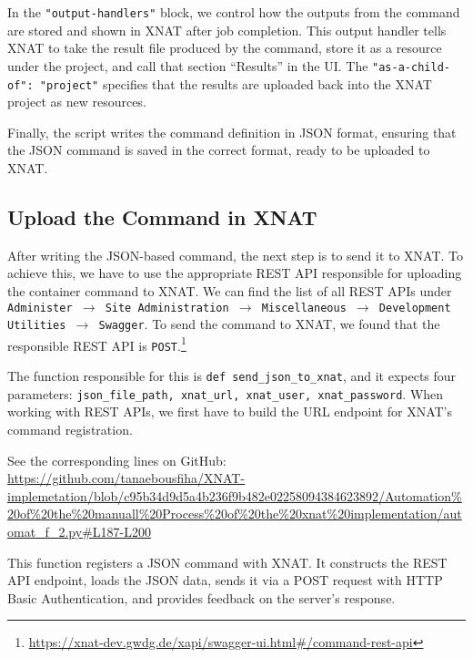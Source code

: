 In the \texttt{"output-handlers"} block, we control how the outputs from the command are stored and shown in XNAT after job completion. This output handler tells XNAT to take the result file produced by the command, store it as a resource under the project, and call that section ``Results'' in the UI. The \texttt{"as-a-child-of": "project"} specifies that the results are uploaded back into the XNAT project as new resources.

Finally, the script writes the command definition in JSON format, ensuring that the JSON command is saved in the correct format, ready to be uploaded to XNAT.

\subsection{Upload the Command in XNAT}

After writing the JSON-based command, the next step is to send it to XNAT. To achieve this, we have to use the appropriate REST API responsible for uploading the container command to XNAT.
We can find the list of all REST APIs under \texttt{Administer $\rightarrow$ Site Administration $\rightarrow$ Miscellaneous $\rightarrow$ Development Utilities $\rightarrow$ Swagger}.
To send the command to XNAT, we found that the responsible REST API is \texttt{POST}.\footnote{\url{https://xnat-dev.gwdg.de/xapi/swagger-ui.html\#/command-rest-api}}

The function responsible for this is \texttt{def send\_json\_to\_xnat}, and it expects four parameters: \texttt{json\_file\_path, xnat\_url, xnat\_user, xnat\_password}. When working with REST APIs, we first have to build the URL endpoint for XNAT’s command registration.
 


\noindent\footnotesize See the corresponding lines on GitHub:\url{ https://github.com/tanaebousfiha/XNAT-implemetation/blob/c95b34d9d5a4b236f9b482e02258094384623892/Automation%20of%20the%20manuall%20Process%20of%20the%20xnat%20implementation/automat_f_2.py#L187-L200}

This function registers a JSON command with XNAT. It constructs the REST API endpoint, loads the JSON data, sends it via a POST request with HTTP Basic Authentication, and provides feedback on the server's response.

